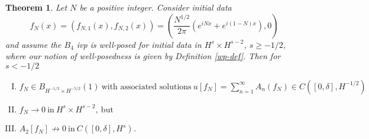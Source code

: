 \documentclass[12pt,reqno]{amsart}
\numberwithin{equation}{section}  %
\newtheorem{theorem}{Theorem}[section]
\begin{document}
\begin{theorem}
  Let $N$ be a positive integer. Consider initial data $$f_{N}(x) =
  (f_{N,1}(x), f_{N,2}(x)) = \left ( \frac{N^{1/2}}{2
  \pi} \left( e^{iNx} + e^{i(1-N)x} \right), 0 \right )$$ and assume
  the $B_{4}$ ivp is well-posed for initial data in $H^{s} \times H^{s-2}$, $s
  \ge -1/2$, where our notion of well-posedness is given by Definition \ref{wp-def}.
  Then for $s < -1/2$
    \begin{enumerate}[(I)]
      \item{
    $ f_{N} \in B_{H^{-1/2} \times H^{-5/2}}(1) \ \text{with associated
    solutions}
    \ u[f_{N}] = \sum_{n=1}^{\infty} A_{n}(f_{N}) \in C([0, \delta],
    H^{-1/2})$}
    \\
  \item
    $ f_{N} \to 0 \ \text{in} \ H^{s} \times H^{s-2}, \
    \text{but} $
    \\
  \item
    $ A_{2}[f_{N}] \not \to 0 \ \text{in} \ C([0, \delta], H^{s})$.
\end{enumerate}
\label{thm:ill-pos}
\end{theorem}
%
%
%
%
%
%
%
%
%
%
%
\end{document}
